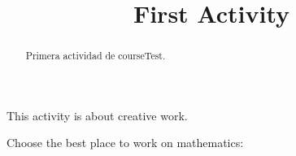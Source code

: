 \documentclass{ximera}
\title{First Activity}
\begin{document}
  
\begin{abstract}  
	Primera actividad de courseTest.
\end{abstract}  
\maketitle  

This activity is about creative work.  
\begin{exercise}  
  Choose the best place to work on mathematics:
  \begin{multipleChoice}  
  \end{multipleChoice}  
\end{exercise}  
\end{document}
